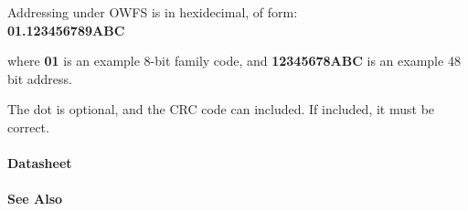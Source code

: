 \begin{description}
\item [Addressing under OWFS is in hexidecimal, of form: ] 
\item [\textbf{01.123456789ABC}
] 
\end{description}


where \textbf{01} is an example 8-bit family code, and \textbf{12345678ABC} is an example
48 bit address. 

The dot is optional, and the CRC code can included. If included,
it must be correct.  
\paragraph*{Datasheet}





\paragraph*{See Also}

